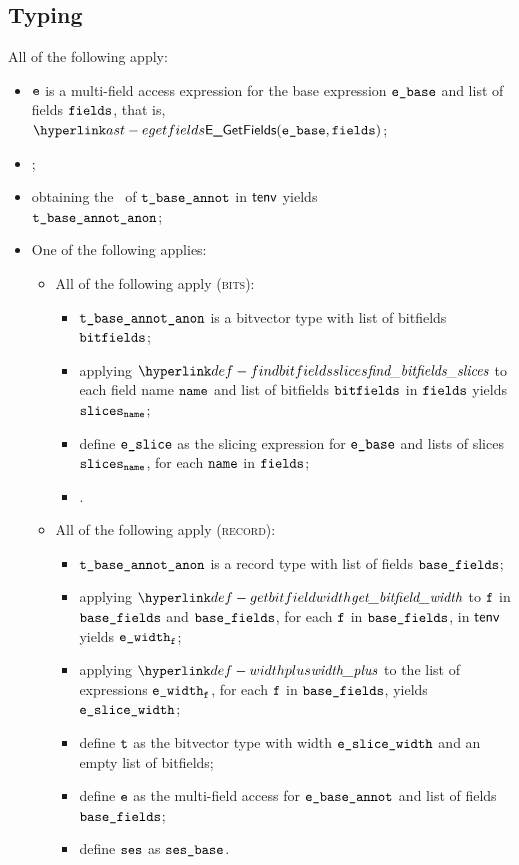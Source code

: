 \subsection{Typing}
\ProseParagraph
All of the following apply:
\begin{itemize}
  \item $\texttt{e}$ is a multi-field access expression for the base expression $\ebase$ and list of fields $\texttt{fields}$,
        that is, $\EGetFields(\ebase, \vfields)$;
  \item \Proseannotateexpr{$\tenv$}{$\ebase$}{\\ $(\tbaseannot, \vetwo, \vsesbase)$}\ProseOrTypeError;
  \item obtaining the \underlyingtype\ of $\texttt{t\_base\_annot}$ in $\tenv$ yields \\
        $\texttt{t\_base\_annot\_anon}$\ProseOrTypeError;
  \item One of the following applies:
  \begin{itemize}
    \item All of the following apply (\textsc{bits}):
    \begin{itemize}
      \item $\texttt{t\_base\_annot\_anon}$ is a bitvector type with list of bitfields $\texttt{bitfields}$\ProseOrTypeError;
      \item applying $\findbitfieldsslices$ to each field name $\texttt{name}$ and list of bitfields $\texttt{bitfields}$ in $\texttt{fields}$ yields \\
            $\texttt{slices}_{\texttt{name}}$\ProseOrTypeError;
      \item define $\veslice$ as the slicing expression for $\ebase$ and lists of slices $\texttt{slices}_{\texttt{name}}$, for each $\texttt{name}$ in $\texttt{fields}$;
      \item \Proseannotateexpr{$\tenv$}{$\veslice$}{\\ $(\vt, \newe, \vses)$}\ProseOrTypeError.
    \end{itemize}

    \item All of the following apply (\textsc{record}):
    \begin{itemize}
      \item $\texttt{t\_base\_annot\_anon}$ is a record type with list of fields $\texttt{base\_fields}$\ProseOrTypeError;
      \item applying $\getbitfieldwidth$ to $\texttt{f}$ in $\texttt{base\_fields}$ and $\texttt{base\_fields}$, for each $\texttt{f}$ in $\texttt{base\_fields}$, in $\tenv$ yields $\texttt{e\_width}_{\texttt{f}}$\ProseOrTypeError;
      \item applying $\widthplus$ to the list of expressions $\texttt{e\_width}_{\texttt{f}}$,
            for each $\texttt{f}$ in $\texttt{base\_fields}$, yields $\texttt{e\_slice\_width}$\ProseOrTypeError;
      \item define $\texttt{t}$ as the bitvector type with width $\texttt{e\_slice\_width}$ and an empty list of bitfields;
      \item define $\texttt{e}$ as the multi-field access for $\texttt{e\_base\_annot}$ and list of fields \\
            $\texttt{base\_fields}$;
      \item define $\texttt{ses}$ as $\texttt{ses\_base}$.
    \end{itemize}


\end{itemize}
\end{itemize}
